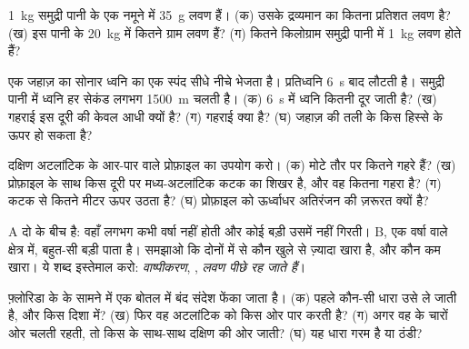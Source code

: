 \begin{exercise}[$\star\star$]\label{exo:g8:the-oceans:5}
\qty{1}{kg} समुद्री पानी के एक नमूने में \qty{35}{g} लवण हैं। (क) उसके द्रव्यमान का
कितना प्रतिशत लवण है? (ख) इस पानी के \qty{20}{kg} में कितने ग्राम लवण हैं? (ग) कितने
किलोग्राम समुद्री पानी में \qty{1}{kg} लवण होते
हैं?
\end{exercise}

\begin{exercise}[$\star\star$]\label{exo:g8:the-oceans:6}
एक जहाज़ का सोनार ध्वनि का एक स्पंद सीधे नीचे भेजता है। प्रतिध्वनि \qty{6}{s} बाद
लौटती है। समुद्री पानी में ध्वनि हर सेकंड लगभग \qty{1500}{m} चलती है। (क) \qty{6}{s}
में ध्वनि कितनी दूर जाती है? (ख) गहराई इस दूरी की केवल आधी क्यों है? (ग) गहराई क्या
है? (घ) जहाज़  की तली के किस हिस्से के ऊपर हो सकता
है?
\end{exercise}

\begin{exercise}[$\star\star$]\label{exo:g8:the-oceans:7}
दक्षिण अटलांटिक के आर-पार वाले प्रोफ़ाइल का उपयोग करो। (क)  मोटे तौर पर
कितने गहरे हैं? (ख) प्रोफ़ाइल के साथ किस दूरी पर मध्य-अटलांटिक कटक का शिखर है, और वह
कितना गहरा है? (ग) कटक  से कितने मीटर ऊपर उठता है? (घ) प्रोफ़ाइल को ऊर्ध्वाधर
अतिरंजन की ज़रूरत क्यों है?
\end{exercise}

\begin{exercise}[$\star\star$]\label{exo:g8:the-oceans:8}
 A दो  के बीच है: वहाँ लगभग कभी वर्षा नहीं होती और कोई बड़ी  उसमें
नहीं गिरती।  B, एक वर्षा वाले क्षेत्र में, बहुत-सी बड़ी  पाता है। समझाओ कि
दोनों में से कौन खुले  से ज़्यादा खारा है, और कौन कम खारा। ये शब्द इस्तेमाल
करो: \emph{वाष्पीकरण}, \emph{}, \emph{लवण पीछे रह
जाते हैं}।
\end{exercise}

\begin{exercise}[$\star\star$]\label{exo:g8:the-oceans:9}
फ़्लोरिडा के  के सामने  में एक बोतल में बंद संदेश फेंका जाता है। (क) पहले कौन-सी
धारा उसे ले जाती है, और किस दिशा में? (ख) फिर वह अटलांटिक को किस ओर पार करती है?
(ग) अगर वह  के चारों ओर चलती रहती, तो किस  के साथ-साथ दक्षिण की ओर जाती?
(घ) यह धारा गरम है या ठंडी?
\end{exercise}

